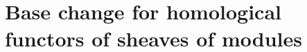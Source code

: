 \section{Base change for homological functors of sheaves of modules}
\label{section:base-change-for-homological-functors-of-sheaves-of-modules}

